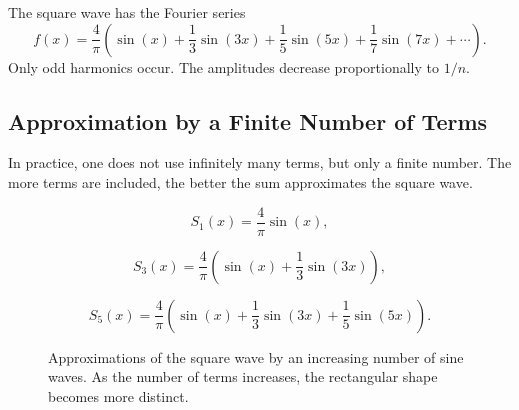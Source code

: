 \begin{MathBox}
	\label{box:anhangA-fourier-rechteckreihe}
	\small
	The square wave has the Fourier series
	\[
	f(x)=\frac{4}{\pi}
	\left(
	\sin(x)
	+\frac{1}{3}\sin(3x)
	+\frac{1}{5}\sin(5x)
	+\frac{1}{7}\sin(7x)
	+\cdots
	\right).
	\]
	Only odd harmonics occur.
	The amplitudes decrease proportionally to \(1/n\).
\end{MathBox}

\subsection{Approximation by a Finite Number of Terms}

In practice, one does not use infinitely many terms,
but only a finite number.
The more terms are included,
the better the sum approximates the square wave.

\[
S_1(x)=\frac{4}{\pi}\sin(x),
\]

\[
S_3(x)=\frac{4}{\pi}
\left(
\sin(x)+\frac{1}{3}\sin(3x)
\right),
\]

\[
S_5(x)=\frac{4}{\pi}
\left(
\sin(x)+\frac{1}{3}\sin(3x)+\frac{1}{5}\sin(5x)
\right).
\]
\FloatBarrier
\begin{figure}[H]
	\centering
	\caption{Approximations of the square wave by an increasing number of sine waves.
		As the number of terms increases, the rectangular shape becomes more distinct.}
	\label{fig:rechtecksignal_fourier_naeherung}
\end{figure}

